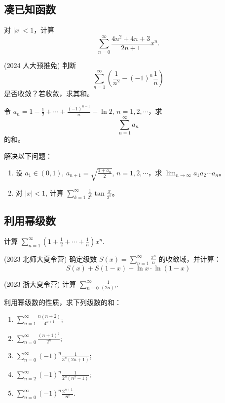 \documentclass[lang=cn,10pt,thmcnt=section]{elegantbook}
\begin{document}
\subsection{凑已知函数}
\begin{example}
	对 $|x| < 1$，计算
\[
\sum_{n=0}^{\infty} \frac{4n^2 + 4n + 3}{2n+1}x^n.
\]
\end{example}
\begin{example}
	(2024 人大预推免) 判断
\[
\sum_{n=1}^{\infty} \left( \frac{1}{n^2} - (-1)^n \frac{1}{n} \right)
\]
是否收敛？若收敛，求其和。
\end{example}
\begin{example}
	令 $a_n = 1 - \frac{1}{2} + \cdots + \frac{(-1)^{n-1}}{n} - \ln 2$, $n = 1, 2, \cdots$，求
\[
\sum_{n=1}^{\infty} a_n
\]
的和。
\end{example}
\begin{example}
	解决以下问题：
\begin{enumerate}
    \item 设 $a_1 \in (0, 1)$, $a_{n+1} = \sqrt{\frac{1 + a_n}{2}}$, $n = 1, 2, \cdots$，求 $\lim_{n \to \infty} a_1 a_2 \cdots a_n$。
    \item 对 $|x| < 1$, 计算 $\sum_{k=1}^{\infty} \frac{1}{2^k} \tan \frac{x}{2^k}$。
\end{enumerate}
\end{example}
\subsection{利用幂级数}
\begin{example}
	计算 $\sum_{n=1}^{\infty} \left(1 + \frac{1}{2} + \cdots + \frac{1}{n}\right) x^n$.
	\end{example}
	
	\begin{example}
	(2023 北师大夏令营) 确定级数 $S(x) = \sum_{n=1}^{\infty} \frac{x^n}{n}$ 的收敛域，并计算：
	\[
	S(x) + S(1-x) + \ln x \cdot \ln(1-x)
	\]
	\end{example}
	
	\begin{example}
	(2023 浙大夏令营) 计算 $\sum_{n=0}^{\infty} \frac{1}{(2n)!}$.
	\end{example}

	\begin{example}
		利用幂级数的性质，求下列级数的和：
		\begin{enumerate}
			\item $\sum_{n=1}^{\infty} \frac{n(n+2)}{4^{n+1}}$;
			\item $\sum_{n=0}^{\infty} \frac{(n+1)^2}{2^n}$;
			\item $\sum_{n=0}^{\infty} (-1)^n \frac{1}{3^n (2n+1)}$;
			\item $\sum_{n=2}^{\infty} (-1)^n \frac{1}{2^n (n^2 - 1)}$;
			\item $\sum_{n=0}^{\infty} (-1)^n \frac{2^{n+1}}{n!}$.
		\end{enumerate}
	\end{example}
\end{document}
